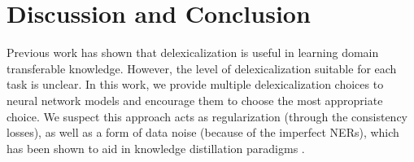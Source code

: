 
\section{Discussion and Conclusion}
Previous work has shown that delexicalization is useful in learning domain transferable knowledge. However, the level of delexicalization suitable for each task is unclear. In this work, we provide multiple delexicalization choices to neural network models and encourage them to choose the most appropriate choice.
We suspect this approach acts as regularization (through the consistency losses), as well as a form of data noise (because of the imperfect NERs), which has been shown to aid in knowledge distillation paradigms \citep{hinton2015distilling,tarvainen2017mean}.

